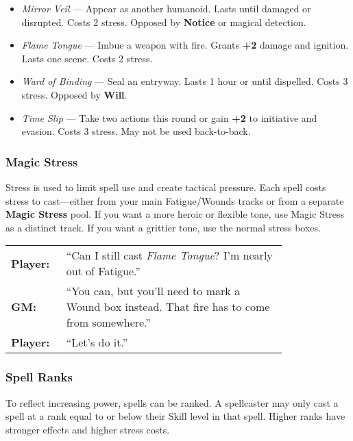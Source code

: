 \begin{Example}
    \begin{itemize}
        \item \textit{Mirror Veil} — Appear as another humanoid. Lasts until damaged or disrupted. Costs 2 stress. Opposed by \textbf{Notice} or magical detection.
        \item \textit{Flame Tongue} — Imbue a weapon with fire. Grants \textbf{+2} damage and ignition. Lasts one scene. Costs 2 stress.
        \item \textit{Ward of Binding} — Seal an entryway. Lasts 1 hour or until dispelled. Costs 3 stress. Opposed by \textbf{Will}.
        \item \textit{Time Slip} — Take two actions this round or gain \textbf{+2} to initiative and evasion. Costs 3 stress. May not be used back-to-back.
    \end{itemize}
\end{Example}

\subsubsection{Magic Stress}

Stress is used to limit spell use and create tactical pressure. Each spell costs stress to cast—either from your main Fatigue/Wounds tracks or from a separate \textbf{Magic Stress} pool. If you want a more heroic or flexible tone, use Magic Stress as a distinct track. If you want a grittier tone, use the normal stress boxes.

\begin{Example}
    \begin{tabular}{@{}l p{0.8\linewidth}@{}}
        \textbf{Player:} & “Can I still cast \textit{Flame Tongue}? I’m nearly out of Fatigue.” \\
        \textbf{GM:} & “You can, but you’ll need to mark a Wound box instead. That fire has to come from somewhere.” \\
        \textbf{Player:} & “Let’s do it.”  
    \end{tabular}
\end{Example}

\subsubsection{Spell Ranks}

To reflect increasing power, spells can be ranked. A spellcaster may only cast a spell at a rank equal to or below their Skill level in that spell. Higher ranks have stronger effects and higher stress costs.

